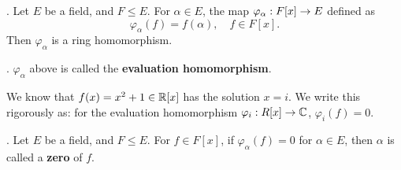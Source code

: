 \thm. Let \(E\) be a field, and \(F \leq E\). For \(\alpha \in E\), the map \(\varphi_\alpha : F[x] \rightarrow E\) defined as
\[
    \varphi_\alpha(f) = f(\alpha), \quad f \in F[x].
\]
Then \(\varphi_\alpha\) is a ring homomorphism.

.  \(\varphi_\alpha\) above is called the \textbf{evaluation homomorphism}.

\rmk We know that \(f(x) = x^2 + 1 \in \mathbb{R}[x]\) has the solution \(x = i\). We write this rigorously as: for the evaluation homomorphism \(\varphi_i : R[x] \rightarrow \mathbb{C}\), \(\varphi_i(f) = 0\).

.  Let \(E\) be a field, and \(F \leq E\). For \(f \in F[x]\), if \(\varphi_\alpha(f) = 0\) for \(\alpha \in E\), then \(\alpha\) is called a \textbf{zero} of \(f\).

\smallskip
